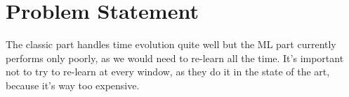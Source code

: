 


\section{Problem Statement}

The classic part handles time evolution quite well but the ML part currently performs only poorly, as we would need to re-learn all the time. It's important not to try to re-learn at every window, as they do it in the state of the art, because it's way too expensive.

